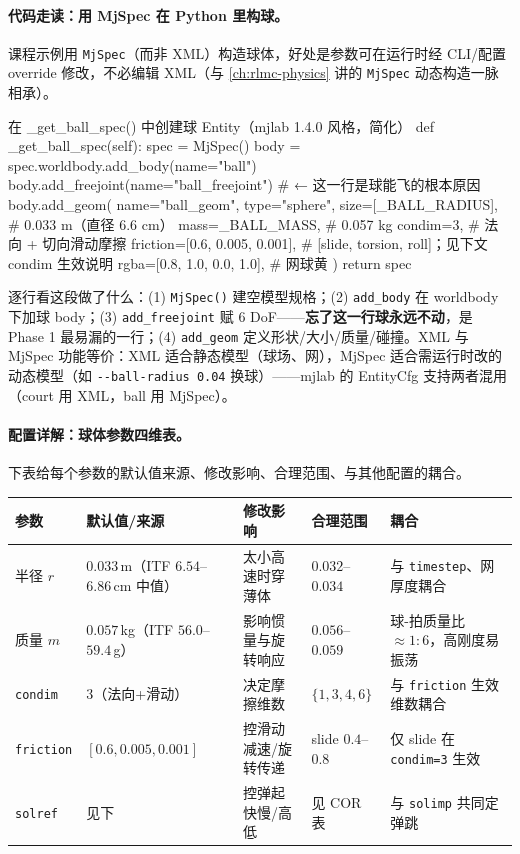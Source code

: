 \paragraph{代码走读：用 MjSpec 在 Python 里构球。}课程示例用 \verb|MjSpec|（而非 XML）构造球体，好处是参数可在运行时经 CLI/配置 override 修改，不必编辑 XML（与 \cref{ch:rlmc-physics} 讲的 \verb|MjSpec| 动态构造一脉相承）。

\begin{codebox}[Python]{在 \_get\_ball\_spec() 中创建球 Entity（mjlab 1.4.0 风格，简化）}
def _get_ball_spec(self):
    spec = MjSpec()
    body = spec.worldbody.add_body(name="ball")
    body.add_freejoint(name="ball_freejoint")  # ← 这一行是球能飞的根本原因
    body.add_geom(
        name="ball_geom", type="sphere",
        size=[_BALL_RADIUS],            # 0.033 m（直径 6.6 cm）
        mass=_BALL_MASS,                # 0.057 kg
        condim=3,                       # 法向 + 切向滑动摩擦
        friction=[0.6, 0.005, 0.001],  # [slide, torsion, roll]；见下文 condim 生效说明
        rgba=[0.8, 1.0, 0.0, 1.0],     # 网球黄
    )
    return spec
\end{codebox}

逐行看这段做了什么：(1) \verb|MjSpec()| 建空模型规格；(2) \verb|add_body| 在 worldbody 下加球 body；(3) \verb|add_freejoint| 赋 $6$ DoF——\textbf{忘了这一行球永远不动}，是 Phase 1 最易漏的一行；(4) \verb|add_geom| 定义形状/大小/质量/碰撞。XML 与 MjSpec 功能等价：XML 适合静态模型（球场、网），MjSpec 适合需运行时改的动态模型（如 \verb|--ball-radius 0.04| 换球）——mjlab 的 EntityCfg 支持两者混用（court 用 XML，ball 用 MjSpec）。

\paragraph{配置详解：球体参数四维表。}下表给每个参数的默认值来源、修改影响、合理范围、与其他配置的耦合。

\begin{center}
\small
\begin{tabular}{@{}lp{2.0cm}p{3.0cm}p{2.4cm}p{2.6cm}@{}}
\toprule
参数 & 默认值/来源 & 修改影响 & 合理范围 & 耦合 \\
\midrule
半径 $r$ & $0.033$\,m（ITF $6.54$--$6.86$\,cm 中值） & 太小高速时穿薄体 & $0.032$--$0.034$ & 与 \verb|timestep|、网厚度耦合 \\
质量 $m$ & $0.057$\,kg（ITF $56.0$--$59.4$\,g） & 影响惯量与旋转响应 & $0.056$--$0.059$ & 球-拍质量比 $\approx1{:}6$，高刚度易振荡 \\
\verb|condim| & $3$（法向+滑动） & 决定摩擦维数 & $\{1,3,4,6\}$ & 与 \verb|friction| 生效维数耦合 \\
\verb|friction| & $[0.6,0.005,0.001]$ & 控滑动减速/旋转传递 & slide $0.4$--$0.8$ & 仅 slide 在 \verb|condim=3| 生效 \\
\verb|solref| & 见下 & 控弹起快慢/高低 & 见 COR 表 & 与 \verb|solimp| 共同定弹跳 \\
\bottomrule
\end{tabular}
\end{center}

